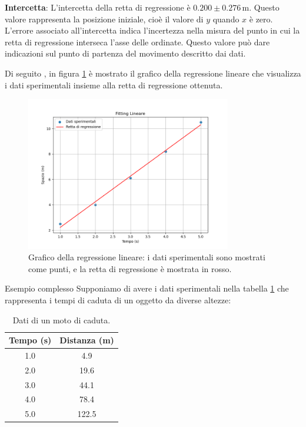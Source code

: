 \documentclass[12pt,a4paper,oneside]{book}
\makeatletter
\renewcommand{\section}{\@startsection{section}{1}{\z@}
{-4ex \@plus -1ex \@minus -.4ex}
{1ex \@plus.2ex }
{\normalfont\large\sffamily\bfseries}}
\theoremstyle{esercizio}
\makeatother
\begin{document}
\textbf{Intercetta}: L'intercetta della retta di regressione è \(0.200 \pm 0.276 \, \si{\meter}\). Questo valore rappresenta la posizione iniziale, cioè il valore di \(y\) quando \(x\) è zero. L'errore associato all'intercetta indica l'incertezza nella misura del punto in cui la retta di regressione interseca l'asse delle ordinate. Questo valore può dare indicazioni sul punto di partenza del movimento descritto dai dati.



Di seguito , in figura \ref{fig:regressione_lineare} è mostrato il grafico della regressione lineare che visualizza i dati sperimentali insieme alla retta di regressione ottenuta.

\begin{figure}[h!]
    \centering
    \includegraphics[width=0.8\textwidth]{regressione_lineare.png}
    \caption{Grafico della regressione lineare: i dati sperimentali sono mostrati come punti, e la retta di regressione è mostrata in rosso.}
    \label{fig:regressione_lineare}
\end{figure}


\section{Esempio complesso}
Supponiamo di avere i dati sperimentali nella tabella \ref{tab:regrcompl} che rappresenta i tempi di caduta di un oggetto da diverse altezze:
\begin{table}[h!]
\centering
\begin{tabular}{|c|c|}
\hline
Tempo (s) & Distanza (m) \\
\hline
1.0 & 4.9 \\
2.0 & 19.6 \\
3.0 & 44.1 \\
4.0 & 78.4 \\
5.0 & 122.5 \\
\hline
\end{tabular}
\caption{Dati di un moto di caduta.}
\label{tab:regrcompl}
\end{table}
\end{document}
